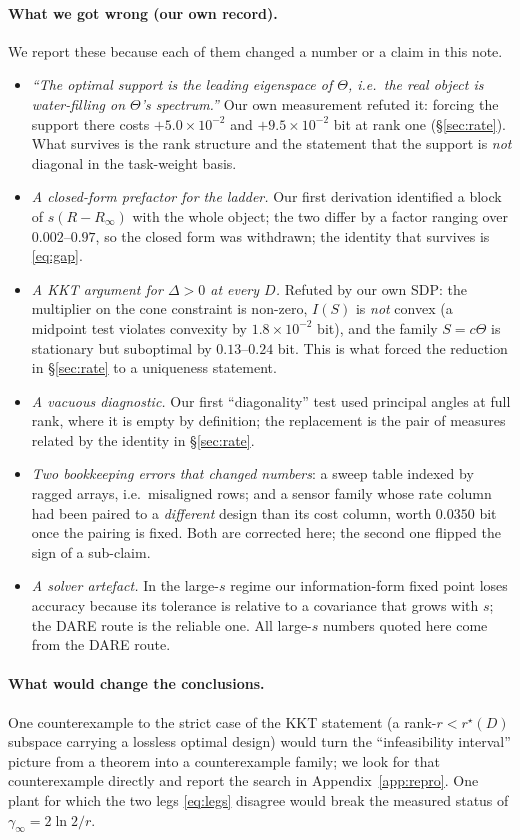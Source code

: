 \paragraph{What we got wrong (our own record).} We report these because each of
them changed a number or a claim in this note.
\begin{itemize}\itemsep2pt
\item \emph{``The optimal support is the leading eigenspace of $\Theta$, i.e.\ the
real object is water-filling on $\Theta$'s spectrum.''} Our own measurement
refuted it: forcing the support there costs $+5.0\times10^{-2}$ and
$+9.5\times10^{-2}$ bit at rank one (\S\ref{sec:rate}). What survives is the rank
structure and the statement that the support is \emph{not} diagonal in the
task-weight basis.
\item \emph{A closed-form prefactor for the ladder.} Our first derivation
identified a block of $s(R-R_\infty)$ with the whole object; the two differ by a
factor ranging over $0.002$--$0.97$, so the closed form was withdrawn; the
identity that survives is \eqref{eq:gap}.
\item \emph{A KKT argument for $\Delta>0$ at every $D$.} Refuted by our own SDP:
the multiplier on the cone constraint is non-zero, $I(S)$ is \emph{not} convex
(a midpoint test violates convexity by $1.8\times10^{-2}$ bit), and the
family $S=c\Theta$ is stationary but suboptimal by $0.13$--$0.24$ bit. This is
what forced the reduction in \S\ref{sec:rate} to a uniqueness statement.
\item \emph{A vacuous diagnostic.} Our first ``diagonality'' test used principal
angles at full rank, where it is empty by definition; the replacement is the
pair of measures related by the identity in \S\ref{sec:rate}.
\item \emph{Two bookkeeping errors that changed numbers}: a sweep table indexed by
ragged arrays, i.e.\ misaligned rows; and a sensor family whose rate column had
been paired to a \emph{different} design than its cost column, worth $0.0350$ bit
once the pairing is fixed. Both are corrected here; the second one flipped the
sign of a sub-claim.
\item \emph{A solver artefact.} In the large-$s$ regime our information-form fixed
point loses accuracy because its tolerance is relative to a covariance that grows
with $s$; the DARE route is the reliable one. All large-$s$ numbers quoted here
come from the DARE route.
\end{itemize}

\paragraph{What would change the conclusions.} One counterexample to the strict
case of the KKT statement (a rank-$r<r^{\star}(D)$ subspace carrying a lossless
optimal design) would turn the ``infeasibility interval'' picture from a theorem
into a counterexample family; we look for that counterexample directly and report
the search in Appendix~\ref{app:repro}. One plant for which the two legs
\eqref{eq:legs} disagree would break the measured status of
$\gamma_\infty=2\ln2/r$.
